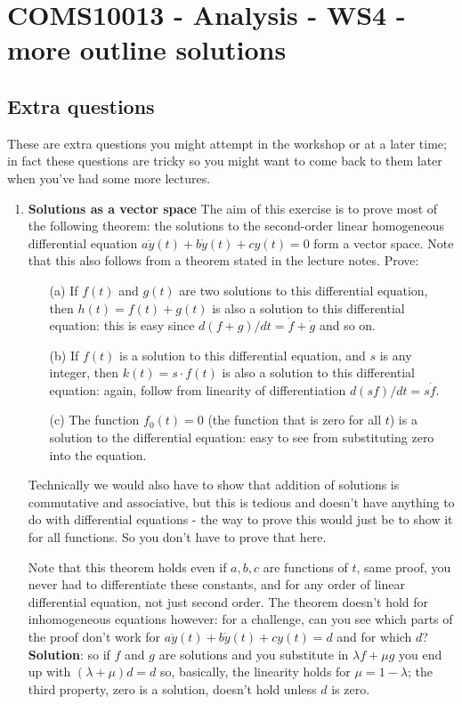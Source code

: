 \documentclass[11pt,a4paper]{scrartcl}
\begin{document}
\section*{COMS10013 - Analysis - WS4 - more outline solutions}

\subsection*{Extra questions}

These are extra questions you might attempt in the workshop or at a
later time; in fact these questions are tricky so you might want to
come back to them later when you've had some more lectures.

\begin{enumerate}

	
	\item \textbf{Solutions as a vector space}	
	The aim of this exercise is to prove most of the following theorem:
	the solutions to the second-order linear homogeneous differential equation
	$a\ddot{y}(t) + b\dot{y}(t) + cy(t) = 0$ form a vector space. Note that this also follows from a theorem stated in the lecture notes. Prove:
	\begin{itemize}
		\item[(a)] If $f(t)$ and $g(t)$ are two solutions to this differential equation, then $h(t) = f(t) + g(t)$ is also a solution to this differential equation: this is easy since $d(f+g)/dt=\dot{f}+\dot{g}$ and so on.
		\item[(b)] If $f(t)$ is a solution to this differential equation,
		and $s$ is any integer, then $k(t) = s \cdot f(t)$ is also a solution to this differential equation: again, follow from linearity of differentiation $d(sf)/dt=s\dot{f}$.
		\item[(c)] The function $f_0(t) = 0$ (the function that is zero for all $t$) is a solution to the differential equation: easy to see from substituting zero into the equation.
	\end{itemize}
	Technically we would also have to show that addition of
        solutions is commutative and associative, but this is tedious
        and doesn't have anything to do with differential equations -
        the way to prove this would just be to show it for all
        functions. So you don't have to prove that here.
	
	Note that this theorem holds even if $a,b,c$ are functions of
        $t$, same proof, you never had to differentiate these
        constants, and for any order of linear differential equation,
        not just second order. The theorem doesn't hold for
        inhomogeneous equations however: for a challenge, can
        you see which parts of the proof don't work for $a\ddot{y}(t) +
        b\dot{y}(t) + cy(t) = d$ and for which $d$? \textbf{Solution}: so if $f$ and $g$ are solutions and you substitute in $\lambda f+\mu g$ you end up with $(\lambda +\mu)d=d$ so, basically, the linearity holds for $\mu=1-\lambda$; the third property, zero is a solution, doesn't hold unless $d$ is zero. 
	

\end{enumerate}
\end{document}
